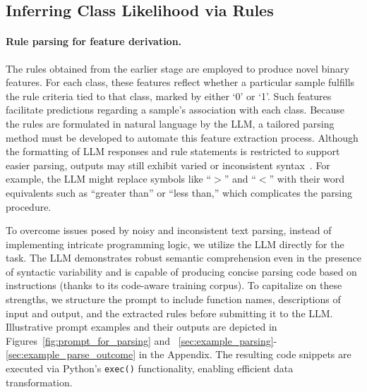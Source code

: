\subsection{Inferring Class Likelihood via Rules}
\label{Sec:training}

\paragraph{Rule parsing for feature derivation.} The rules obtained from the earlier stage are employed to produce novel binary features. For each class, these features reflect whether a particular sample fulfills the rule criteria tied to that class, marked by either ‘0’ or ‘1’. Such features facilitate predictions regarding a sample's association with each class. Because the rules are formulated in natural language by the LLM, a tailored parsing method must be developed to automate this feature extraction process. Although the formatting of LLM responses and rule statements is restricted to support easier parsing, outputs may still exhibit varied or inconsistent syntax~\cite{kovavc2023large}. For example, the LLM might replace symbols like ``$>$'' and ``$<$'' with their word equivalents such as ``greater than'' or ``less than,'' which complicates the parsing procedure. 

To overcome issues posed by noisy and inconsistent text parsing, instead of implementing intricate programming logic, we utilize the LLM directly for the task. The LLM demonstrates robust semantic comprehension even in the presence of syntactic variability and is capable of producing concise parsing code based on instructions (thanks to its code-aware training corpus). To capitalize on these strengths, we structure the prompt to include function names, descriptions of input and output, and the extracted rules before submitting it to the LLM. Illustrative prompt examples and their outputs are depicted in Figures~\ref{fig:prompt_for_parsing} and ~\ref{sec:example_parsing}-\ref{sec:example_parse_outcome} in the Appendix. The resulting code snippets are executed via Python’s \texttt{exec()} functionality, enabling efficient data transformation.

\vspace*{-0.12in}
